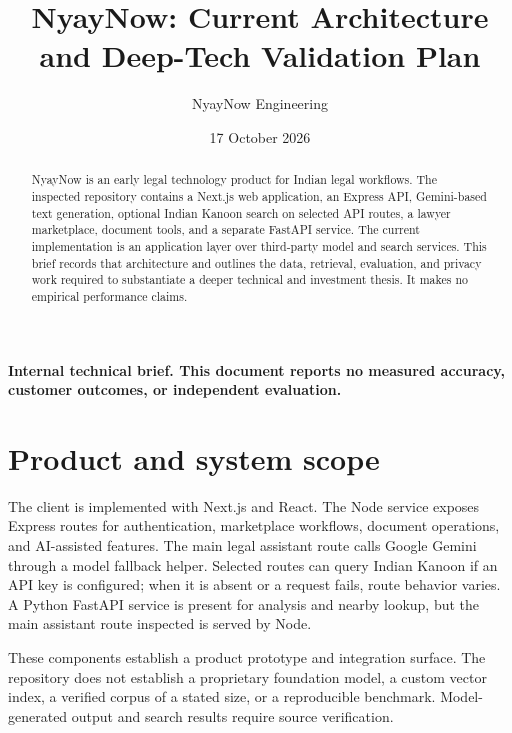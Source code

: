 \documentclass[11pt]{article}
\title{NyayNow: Current Architecture and Deep-Tech Validation Plan}
\author{NyayNow Engineering}
\date{17 October 2026}
\begin{document}
\maketitle

\begin{center}
\textbf{Internal technical brief. This document reports no measured accuracy, customer outcomes, or independent evaluation.}
\end{center}

\begin{abstract}
NyayNow is an early legal technology product for Indian legal workflows. The inspected repository contains a Next.js web application, an Express API, Gemini-based text generation, optional Indian Kanoon search on selected API routes, a lawyer marketplace, document tools, and a separate FastAPI service. The current implementation is an application layer over third-party model and search services. This brief records that architecture and outlines the data, retrieval, evaluation, and privacy work required to substantiate a deeper technical and investment thesis. It makes no empirical performance claims.
\end{abstract}

\section{Product and system scope}
The client is implemented with Next.js and React. The Node service exposes Express routes for authentication, marketplace workflows, document operations, and AI-assisted features. The main legal assistant route calls Google Gemini through a model fallback helper. Selected routes can query Indian Kanoon if an API key is configured; when it is absent or a request fails, route behavior varies. A Python FastAPI service is present for analysis and nearby lookup, but the main assistant route inspected is served by Node.

These components establish a product prototype and integration surface. The repository does not establish a proprietary foundation model, a custom vector index, a verified corpus of a stated size, or a reproducible benchmark. Model-generated output and search results require source verification.
\end{document}
